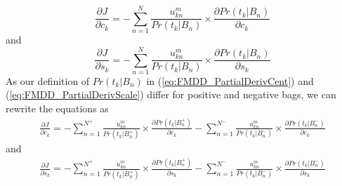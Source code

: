 \documentclass[12pt,dvips]{report}
\numberwithin{equation}{section}
\begin{document}
\begin{equation} \label{eq:FMDD_PartialDerivCent}
\frac{\partial J}{\partial c_{k}}=-\sum_{n=1}^{N}\frac{u_{kn}^{m}}{Pr(t_{k}\vert B_{n})}\times\frac{\partial Pr(t_{k}\vert B_{n})}{\partial c_{k}}
\end{equation} and
\begin{equation} \label{eq:FMDD_PartialDerivScale}
\frac{\partial J}{\partial s_{k}}=-\sum_{n=1}^{N}\frac{u_{kn}^{m}}{Pr(t_{k}\vert B_{n})}\times\frac{\partial Pr(t_{k}\vert B_{n})}{\partial s_{k}}
\end{equation} 
As our definition of $Pr(t_{k}\vert B_{n})$ in (\ref{eq:FMDD_PartialDerivCent}) and (\ref{eq:FMDD_PartialDerivScale}) differ for positive and negative bags, we can rewrite the equations as 
\begin{eqnarray}  \label{eq:FMDD_PartialDerivCentPosNeg}
\frac{\partial J}{\partial c_{k}} = -\sum_{n=1}^{N^{+}}\frac{u_{kn}^{m}}{Pr(t_{k}\vert B_{n}^{+})}\times\frac{\partial Pr(t_{k}\vert B_{n}^{+})}{\partial c_{k}} 
                                                     -\sum_{n=1}^{N^{-}}\frac{u_{kn}^{m}}{Pr(t_{k}\vert B_{n}^{-})}\times\frac{\partial Pr(t_{k}\vert B_{n}^{-})}{\partial c_{k}}
\end{eqnarray}
and
\begin{eqnarray} \label{eq:FMDD_PartialDerivScalePosNeg}
\frac{\partial J}{\partial s_{k}} =  -\sum_{n=1}^{N^{+}}\frac{u_{kn}^{m}}{Pr(t_{k}\vert B_{n}^{+})}\times\frac{\partial Pr(t_{k}\vert B_{n}^{+})}{\partial s_{k}}
                                                     -\sum_{n=1}^{N^{-}}\frac{u_{kn}^{m}}{Pr(t_{k}\vert B_{n}^{-})}\times\frac{\partial Pr(t_{k}\vert B_{n}^{-})}{\partial s_{k}}
\end{eqnarray}
\end{document}
